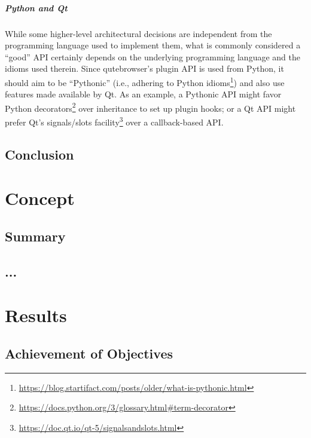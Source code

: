 \documentclass[a4paper,parskip=full]{scrreprt}
\begin{document}
\paragraph{Python and Qt} While some higher-level architectural decisions are
independent from the programming language used to implement them, what is
commonly considered a ``good'' API certainly depends on the underlying
programming language and the idioms used therein. Since qutebrowser's plugin API
is used from Python, it should aim to be ``Pythonic'' (i.e., adhering to Python
idioms\footnote{\url{https://blog.startifact.com/posts/older/what-is-pythonic.html}})
and also use features made available by Qt. As an example, a Pythonic API might
favor Python
decorators\footnote{\url{https://docs.python.org/3/glossary.html\#term-decorator}}
over inheritance to set up plugin hooks; or a Qt API might prefer Qt's
signals/slots
facility\footnote{\url{https://doc.qt.io/qt-5/signalsandslots.html}} over a
callback-based API.


\section{Conclusion}


\chapter{Concept}

\section{Summary}

\section{...}


\chapter{Results}

\section{Achievement of Objectives}
\end{document}
